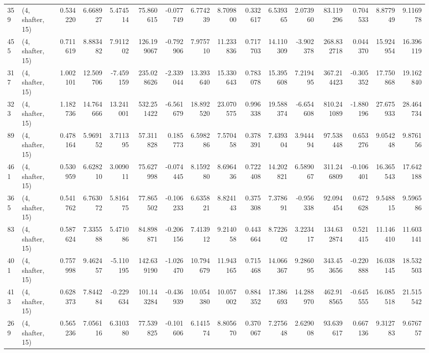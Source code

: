 \begin{tabular}{llrrrrrrrrrrrrrr}
359 &  (4, shafter, 15) &   0.534220 &   6.668927 &   5.474514 &    75.860615 &  -0.077749 &   6.774239 &   8.709800 &  0.332617 &   6.539365 &   2.073960 &     83.119296 &    0.704533 &    8.877949 &    9.116978 \\
455 &  (4, shafter, 15) &   0.711619 &   8.883482 &   7.911202 &   126.199067 &  -0.792906 &   7.975710 &  11.233836 &  0.717703 &  14.110309 &  -3.902378 &    268.832718 &    0.044370 &   15.924954 &   16.396119 \\
317 &  (4, shafter, 15) &   1.002101 &  12.509706 &  -7.459159 &   235.028626 &  -2.339044 &  13.393640 &  15.330643 &  0.783078 &  15.395608 &   7.219495 &    367.214423 &   -0.305352 &   17.750868 &   19.162840 \\
323 &  (4, shafter, 15) &   1.182736 &  14.764666 &  13.241001 &   532.251422 &  -6.561679 &  18.892520 &  23.070575 &  0.996338 &  19.588374 &  -6.654608 &    810.241089 &   -1.880196 &   27.675933 &   28.464734 \\
89  &  (4, shafter, 15) &   0.478164 &   5.969152 &   3.711395 &    57.311828 &   0.185773 &   6.598286 &   7.570458 &  0.378391 &   7.439304 &   3.944494 &     97.538448 &    0.653276 &    9.054248 &    9.876156 \\
461 &  (4, shafter, 15) &   0.530959 &   6.628210 &   3.009011 &    75.627998 &  -0.074445 &   8.159280 &   8.696436 &  0.722408 &  14.202821 &   6.589067 &    311.246809 &   -0.106401 &   16.365543 &   17.642188 \\
365 &  (4, shafter, 15) &   0.541762 &   6.763072 &   5.816475 &    77.865502 &  -0.106233 &   6.635821 &   8.824143 &  0.375308 &   7.378691 &  -0.956338 &     92.094454 &    0.672628 &    9.548815 &    9.596586 \\
83  &  (4, shafter, 15) &   0.587624 &   7.335588 &   5.471086 &    84.898871 &  -0.206156 &   7.413912 &   9.214058 &  0.443664 &   8.722602 &   3.223417 &    134.632874 &    0.521415 &   11.146410 &   11.603141 \\
401 &  (4, shafter, 15) &   0.757998 &   9.462457 &  -5.110195 &   142.639190 &  -1.026470 &  10.794679 &  11.943165 &  0.715468 &  14.066367 &   9.286095 &    343.453656 &   -0.220888 &   16.038145 &   18.532503 \\
413 &  (4, shafter, 15) &   0.628373 &   7.844284 &  -0.229634 &   101.143284 &  -0.436939 &  10.054380 &  10.057002 &  0.884352 &  17.386693 &  14.288970 &    462.918565 &   -0.645555 &   16.085518 &   21.515542 \\
269 &  (4, shafter, 15) &   0.565236 &   7.056116 &   6.310380 &    77.539825 &  -0.101606 &   6.141574 &   8.805670 &  0.370067 &   7.275648 &   2.629008 &     93.639617 &    0.667136 &    9.312783 &    9.676757 \\

\end{tabular}
